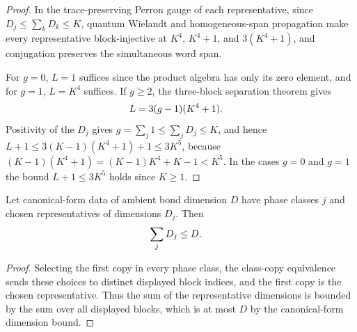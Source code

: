 \begin{proof}
    \leanok
    In the trace-preserving Perron gauge of each representative, since
    $D_j\leq\sum_kD_k\leq K$, quantum Wielandt and homogeneous-span
    propagation make every representative block-injective at $K^4$,
    $K^4+1$, and $3(K^4+1)$, and conjugation preserves the simultaneous word
    span.

    For $g=0$, $L=1$ suffices since the product algebra has only its zero
    element, and for $g=1$, $L=K^4$ suffices. If $g\geq2$, the three-block
    separation theorem gives
    \begin{align}
        L & =3(g-1)(K^4+1).
        \notag
    \end{align}
    Positivity of the $D_j$ gives
    $g=\sum_j1\leq\sum_jD_j\leq K$, and hence
    $L+1\leq3(K-1)(K^4+1)+1\leq3K^5$, because
    $(K-1)(K^4+1)=(K-1)K^4+K-1<K^5$. In the cases $g=0$ and $g=1$ the bound
    $L+1\leq3K^5$ holds since $K\geq1$.
\end{proof}

\begin{lemma}
    \label{thm:cpsv_bnt_dimension_bound}
    \leanok
    Let canonical-form data of ambient bond dimension $D$ have
    phase classes $j$ and chosen representatives of dimensions $D_j$. Then
    \begin{align}
        \sum_jD_j & \leq D.
        \notag
    \end{align}
\end{lemma}

\begin{proof}
    \leanok
    Selecting the first copy in every phase class, the class-copy
    equivalence sends these choices to distinct displayed block indices, and
    the first copy is the chosen representative. Thus the sum of the
    representative dimensions is bounded by the sum over all displayed
    blocks, which is at most $D$ by the canonical-form dimension bound.
\end{proof}

